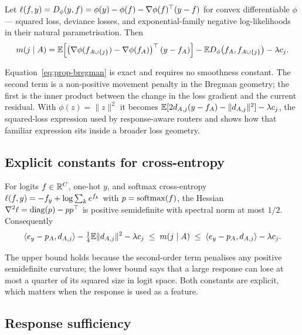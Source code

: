 \begin{proposition}
\label{prop:bregman}
Let $\ell(f,y)=D_\phi(y,f)=\phi(y)-\phi(f)-\nabla\phi(f)^\top(y-f)$ for convex
differentiable $\phi$ --- squared loss, deviance losses, and exponential-family
negative log-likelihoods in their natural parametrisation. Then
\begin{equation}
 m(j\mid A)
 =
 \mathbb{E}\!\left[\left(\nabla\phi(f_{A\cup\{j\}})-\nabla\phi(f_A)\right)^\top(y-f_A)\right]
 -\mathbb{E} D_\phi\!\left(f_A,f_{A\cup\{j\}}\right)
 -\lambda c_j .
 \label{eq:prop-bregman}
\end{equation}
\end{proposition}

Equation~\eqref{eq:prop-bregman} is exact and requires no smoothness constant.
The second term is a non-positive movement penalty in the Bregman geometry; the
first is the inner product between the change in the loss gradient and the
current residual. With $\phi(z)=\|z\|^2$ it becomes
$\mathbb{E}[2d_{A,j}(y-f_A)-\|d_{A,j}\|^2]-\lambda c_j$, the squared-loss expression used by
response-aware routers and shows how that familiar expression sits inside a
broader loss geometry.

\subsection{Explicit constants for cross-entropy}

\begin{proposition}
\label{prop:ce}
For logits $f\in\mathbb{R}^C$, one-hot $y$, and softmax cross-entropy
$\ell(f,y)=-f_y+\log\sum_k e^{f_k}$ with $p=\mathrm{softmax}(f)$, the Hessian
$\nabla^2\ell=\mathrm{diag}(p)-pp^\top$ is positive semidefinite with spectral norm at
most $1/2$. Consequently
\begin{equation}
 \langle e_y-p_A,d_{A,j}\rangle-\tfrac14\mathbb{E}\|d_{A,j}\|^2-\lambda c_j
 \;\leq\;
 m(j\mid A)
 \;\leq\;
 \langle e_y-p_A,d_{A,j}\rangle-\lambda c_j .
 \label{eq:prop-ce}
\end{equation}
\end{proposition}

The upper bound holds because the second-order term penalises any positive
semidefinite curvature; the lower bound says that a large response can lose at
most a quarter of its squared size in logit space. Both constants are explicit,
which matters when the response is used as a feature.

\subsection{Response sufficiency}

